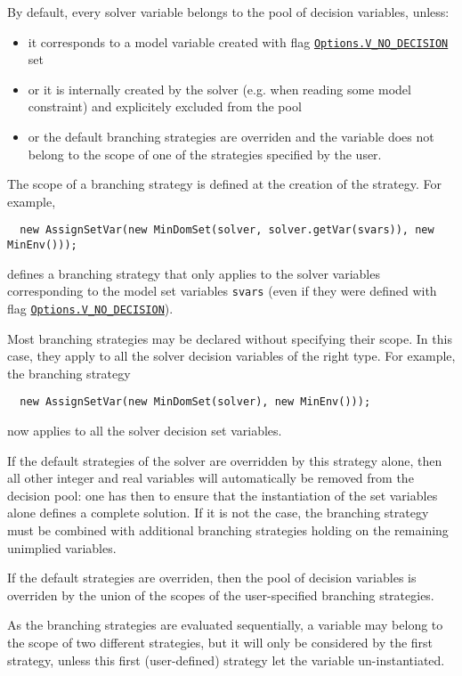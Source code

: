By default, every solver variable belongs to the pool of decision variables, unless:
\begin{itemize}
\item it corresponds to a model variable created with flag \hyperlink{vnodecision:vnodecisionoptions}{\tt Options.V\_NO\_DECISION} set
\item or it is internally created by the solver (e.g. when reading some model constraint) and explicitely excluded from the pool
\item or the default branching strategies are overriden and the variable does not belong to the scope of one of the strategies specified by the user.
\end{itemize}

The scope of a branching strategy is defined at the creation of the strategy. For example,
\begin{lstlisting}
  new AssignSetVar(new MinDomSet(solver, solver.getVar(svars)), new MinEnv()));
\end{lstlisting}
defines a branching strategy that only applies to the solver variables corresponding to the model set variables \texttt{svars} (even if they were defined with flag \hyperlink{vnodecision:vnodecisionoptions}{\tt Options.V\_NO\_DECISION}).

Most branching strategies may be declared without specifying their scope. In this case, they apply to all the solver decision variables of the right type. For example, the branching strategy
\begin{lstlisting}
  new AssignSetVar(new MinDomSet(solver), new MinEnv()));
\end{lstlisting}
now applies to all the solver decision set variables.

If the default strategies of the solver are overridden by this strategy alone, then all other integer and real variables will automatically be removed from the decision pool: one has then to ensure that the instantiation of the set variables alone defines a complete solution.
If it is not the case, the branching strategy must be combined with additional branching strategies holding on the remaining unimplied variables.
\begin{note}
  If the default strategies are overriden, then the pool of decision variables is overriden by the union of the scopes of the user-specified branching strategies.
\end{note}
As the branching strategies are evaluated sequentially, a variable may belong to the scope of two different strategies, but it will only be considered by the first strategy, unless this first (user-defined) strategy let the variable un-instantiated.

